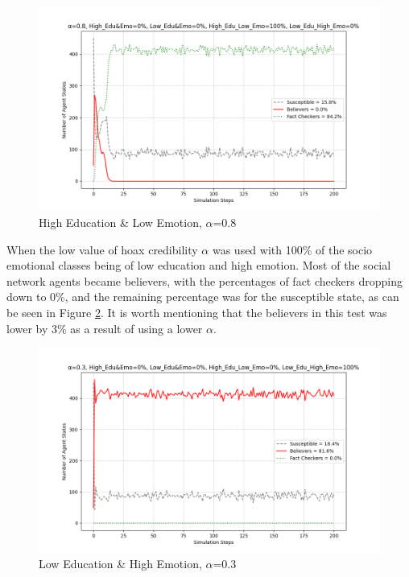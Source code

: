 \documentclass[twocolumn, a4paper, 12pt]{article}
\begin{document}
\begin{figure}[H]
    \centering
    \includegraphics[width=1\linewidth]{0.8_alpha_high.png}
    \caption{High Education \& Low Emotion, $\alpha$=0.8}
    \label{fig:4}
\end{figure}

When the low value of hoax credibility $\alpha$ was used with 100\% of the socio emotional classes being of low education and high emotion. Most of the social network agents became believers, with the percentages of fact checkers dropping down to 0\%, and the remaining percentage was for the susceptible state, as can be seen in Figure \ref{fig:5}. It is worth mentioning that the believers in this test was lower by 3\% as a result of using a lower $\alpha$.

\begin{figure}[H]
    \centering
    \includegraphics[width=1\linewidth]{0.3_alpha_low_edu.png}
    \caption{Low Education \& High Emotion, $\alpha$=0.3}
    \label{fig:5}
\end{figure}
\end{document}
